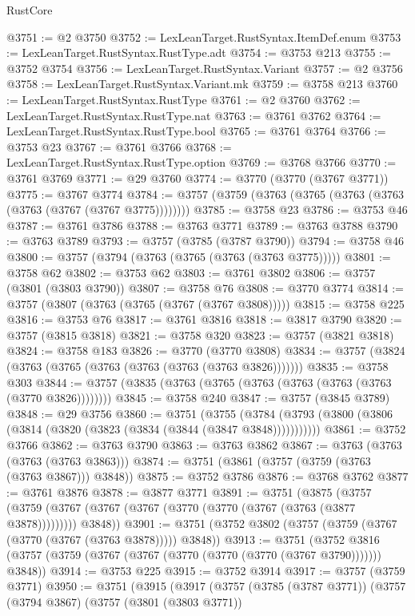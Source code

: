 \begin{lexlean}{RustCore}
\begin{coremodule}
@3751 := @2 @3750
@3752 := LexLeanTarget.RustSyntax.ItemDef.enum
@3753 := LexLeanTarget.RustSyntax.RustType.adt
@3754 := @3753 @213
@3755 := @3752 @3754
@3756 := LexLeanTarget.RustSyntax.Variant
@3757 := @2 @3756
@3758 := LexLeanTarget.RustSyntax.Variant.mk
@3759 := @3758 @213
@3760 := LexLeanTarget.RustSyntax.RustType
@3761 := @2 @3760
@3762 := LexLeanTarget.RustSyntax.RustType.nat
@3763 := @3761 @3762
@3764 := LexLeanTarget.RustSyntax.RustType.bool
@3765 := @3761 @3764
@3766 := @3753 @23
@3767 := @3761 @3766
@3768 := LexLeanTarget.RustSyntax.RustType.option
@3769 := @3768 @3766
@3770 := @3761 @3769
@3771 := @29 @3760
@3774 := @3770 (@3770 (@3767 @3771))
@3775 := @3767 @3774
@3784 := @3757 (@3759 (@3763 (@3765 (@3763 (@3763 (@3763 (@3767 (@3767 @3775))))))))
@3785 := @3758 @23
@3786 := @3753 @46
@3787 := @3761 @3786
@3788 := @3763 @3771
@3789 := @3763 @3788
@3790 := @3763 @3789
@3793 := @3757 (@3785 (@3787 @3790))
@3794 := @3758 @46
@3800 := @3757 (@3794 (@3763 (@3765 (@3763 (@3763 @3775)))))
@3801 := @3758 @62
@3802 := @3753 @62
@3803 := @3761 @3802
@3806 := @3757 (@3801 (@3803 @3790))
@3807 := @3758 @76
@3808 := @3770 @3774
@3814 := @3757 (@3807 (@3763 (@3765 (@3767 (@3767 @3808)))))
@3815 := @3758 @225
@3816 := @3753 @76
@3817 := @3761 @3816
@3818 := @3817 @3790
@3820 := @3757 (@3815 @3818)
@3821 := @3758 @320
@3823 := @3757 (@3821 @3818)
@3824 := @3758 @183
@3826 := @3770 (@3770 @3808)
@3834 := @3757 (@3824 (@3763 (@3765 (@3763 (@3763 (@3763 (@3763 @3826)))))))
@3835 := @3758 @303
@3844 := @3757 (@3835 (@3763 (@3765 (@3763 (@3763 (@3763 (@3763 (@3770 @3826))))))))
@3845 := @3758 @240
@3847 := @3757 (@3845 @3789)
@3848 := @29 @3756
@3860 := @3751
    (@3755 (@3784 (@3793 (@3800 (@3806 (@3814 (@3820 (@3823 (@3834 (@3844 (@3847 @3848)))))))))))
@3861 := @3752 @3766
@3862 := @3763 @3790
@3863 := @3763 @3862
@3867 := @3763 (@3763 (@3763 (@3763 @3863)))
@3874 := @3751 (@3861 (@3757 (@3759 (@3763 (@3763 @3867))) @3848))
@3875 := @3752 @3786
@3876 := @3768 @3762
@3877 := @3761 @3876
@3878 := @3877 @3771
@3891 := @3751
    (@3875
      (@3757 (@3759 (@3767 (@3767 (@3767 (@3770 (@3770 (@3767 (@3763 (@3877 @3878))))))))) @3848))
@3901 := @3751 (@3752 @3802 (@3757 (@3759 (@3767 (@3770 (@3767 (@3763 @3878))))) @3848))
@3913 := @3751
    (@3752 @3816 (@3757 (@3759 (@3767 (@3767 (@3770 (@3770 (@3770 (@3767 @3790))))))) @3848))
@3914 := @3753 @225
@3915 := @3752 @3914
@3917 := @3757 (@3759 @3771)
@3950 := @3751
    (@3915
      (@3917
        (@3757
          (@3785 (@3787 @3771))
          (@3757
            (@3794 @3867)
            (@3757
              (@3801 (@3803 @3771))

\end{coremodule}
\end{lexlean}
